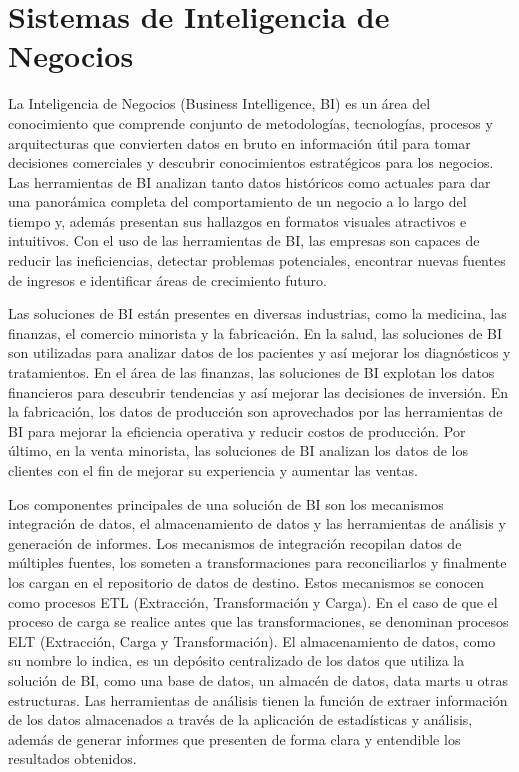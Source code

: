 \chapter{Sistemas de Inteligencia de Negocios}\label{chapter:bi-systems}

La Inteligencia de Negocios (Business Intelligence, BI) es un \'area del conocimiento que comprende conjunto de metodologías, 
tecnologías, procesos y arquitecturas que convierten datos 
en bruto en información útil para tomar decisiones comerciales y descubrir conocimientos estratégicos para los negocios. 
Las herramientas de BI analizan tanto datos históricos como actuales para dar una panor\'amica completa del comportamiento 
de un negocio a lo largo del tiempo y, adem\'as presentan sus hallazgos en formatos visuales atractivos e intuitivos. 
Con el uso de las herramientas de BI, las empresas son capaces de reducir las ineficiencias, detectar problemas potenciales, 
encontrar nuevas fuentes de ingresos e identificar áreas de crecimiento futuro.

Las soluciones de BI est\'an presentes en diversas industrias, como la medicina, las finanzas, el comercio minorista y la 
fabricación. En la salud, las soluciones de BI son utilizadas para analizar datos de los pacientes y as\'i mejorar los
diagn\'osticos y tratamientos. En el \'area de las finanzas, las soluciones de BI explotan los datos financieros para 
descubrir tendencias y as\'i mejorar las decisiones de inversi\'on. En la fabricación, los datos de producción son aprovechados 
por las herramientas de BI para mejorar la eficiencia operativa y reducir costos de producción. Por \'ultimo, en la 
venta minorista, las soluciones de BI analizan los datos de los clientes con el fin de mejorar su experiencia y 
aumentar las ventas.

Los componentes principales de una solución de BI son los mecanismos integración de datos, el almacenamiento de datos y 
las herramientas de análisis y generaci\'on de informes\cite{lloyd2011identifying}. Los mecanismos de integración recopilan datos de múltiples fuentes, 
los someten a transformaciones para reconciliarlos y finalmente los cargan en el repositorio de datos de destino. Estos mecanismos se 
conocen como procesos ETL (Extracción, Transformación y Carga). En el caso de que el proceso de carga se realice antes que las transformaciones, 
se denominan procesos ELT (Extracción, Carga y Transformación). 
El almacenamiento de datos, como su nombre lo indica, es un depósito centralizado de los datos que utiliza la solución
de BI, como una base de datos, un almac\'en de datos, data marts u otras estructuras. Las herramientas de análisis tienen la función de extraer 
información de los datos almacenados a través de la aplicación de estadísticas y análisis, adem\'as de generar 
informes que presenten de forma clara y entendible los resultados obtenidos.

